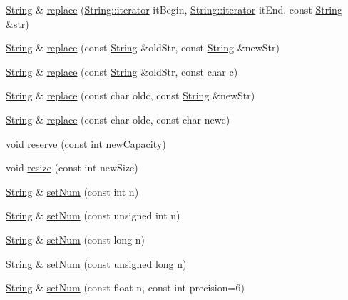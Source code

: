 \begin{DoxyCompactItemize}
\hyperlink{classprism_1_1_string}{String} \& \hyperlink{classprism_1_1_string_a0a8ad9ff92bb002dfb4c13625ad93d24}{replace} (\hyperlink{classprism_1_1_string_adacc7975837e5fff95d70690777fb330}{String\+::iterator} it\+Begin, \hyperlink{classprism_1_1_string_adacc7975837e5fff95d70690777fb330}{String\+::iterator} it\+End, const \hyperlink{classprism_1_1_string}{String} \&str)
\item 
\hyperlink{classprism_1_1_string}{String} \& \hyperlink{classprism_1_1_string_a81e268b27da75c013b41e400b2fcb2f1}{replace} (const \hyperlink{classprism_1_1_string}{String} \&old\+Str, const \hyperlink{classprism_1_1_string}{String} \&new\+Str)
\item 
\hyperlink{classprism_1_1_string}{String} \& \hyperlink{classprism_1_1_string_a8187856b0d5d91bbcbfef8305904f3f2}{replace} (const \hyperlink{classprism_1_1_string}{String} \&old\+Str, const char c)
\item 
\hyperlink{classprism_1_1_string}{String} \& \hyperlink{classprism_1_1_string_a572260554eada6b9171327b33c6f421e}{replace} (const char oldc, const \hyperlink{classprism_1_1_string}{String} \&new\+Str)
\item 
\hyperlink{classprism_1_1_string}{String} \& \hyperlink{classprism_1_1_string_acb98024bec3abd2c69879e63140c345a}{replace} (const char oldc, const char newc)
\item 
void \hyperlink{classprism_1_1_string_aed752cc8c9e59a7b2366b85ab20a656b}{reserve} (const int new\+Capacity)
\item 
void \hyperlink{classprism_1_1_string_a77b3580eba01007afc7089cfd334abd5}{resize} (const int new\+Size)
\item 
\hyperlink{classprism_1_1_string}{String} \& \hyperlink{classprism_1_1_string_a347d7ae9b3e5dcbc8da9902cdd64c3ab}{set\+Num} (const int n)
\item 
\hyperlink{classprism_1_1_string}{String} \& \hyperlink{classprism_1_1_string_a69294c6d468968ab31201f873b928c71}{set\+Num} (const unsigned int n)
\item 
\hyperlink{classprism_1_1_string}{String} \& \hyperlink{classprism_1_1_string_a1a5d7918d3b7ccf24304c003f3a14f6f}{set\+Num} (const long n)
\item 
\hyperlink{classprism_1_1_string}{String} \& \hyperlink{classprism_1_1_string_aa4874606f40ab093dfee5a57a7700193}{set\+Num} (const unsigned long n)
\item 
\hyperlink{classprism_1_1_string}{String} \& \hyperlink{classprism_1_1_string_ad9b75f3944646b1133eba004c802cdaa}{set\+Num} (const float n, const int precision=6)

\end{DoxyCompactItemize}
